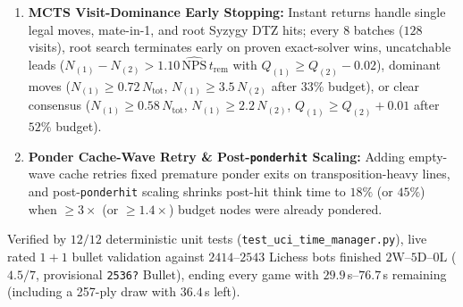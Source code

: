 \documentclass[10pt,twocolumn]{article}
\begin{document}
\begin{enumerate}
  \item \textbf{MCTS Visit-Dominance Early Stopping:} Instant returns handle single legal moves, mate-in-1, and root Syzygy DTZ hits; every 8 batches ($128$ visits), root search terminates early on proven exact-solver wins, uncatchable leads ($N_{(1)} - N_{(2)} > 1.10\,\widehat{\mathrm{NPS}}\,t_{\mathrm{rem}}$ with $Q_{(1)} \ge Q_{(2)} - 0.02$), dominant moves ($N_{(1)} \ge 0.72\,N_{\mathrm{tot}}$, $N_{(1)} \ge 3.5\,N_{(2)}$ after $33\%$ budget), or clear consensus ($N_{(1)} \ge 0.58\,N_{\mathrm{tot}}$, $N_{(1)} \ge 2.2\,N_{(2)}$, $Q_{(1)} \ge Q_{(2)} + 0.01$ after $52\%$ budget).
  \item \textbf{Ponder Cache-Wave Retry \& Post-\texttt{ponderhit} Scaling:} Adding empty-wave cache retries fixed premature ponder exits on transposition-heavy lines, and post-\texttt{ponderhit} scaling shrinks post-hit think time to $18\%$ (or $45\%$) when $\ge 3\times$ (or $\ge 1.4\times$) budget nodes were already pondered.
\end{enumerate}
Verified by $12/12$ deterministic unit tests (\texttt{test\_uci\_time\_manager.py}), live rated $1+1$ bullet validation against $2414\text{--}2543$ Lichess bots finished $2\text{W}\text{--}5\text{D}\text{--}0\text{L}$ ($4.5/7$, provisional \texttt{2536?} Bullet), ending every game with $29.9$\,s--$76.7$\,s remaining (including a 257-ply draw with $36.4$\,s left).
\end{document}
